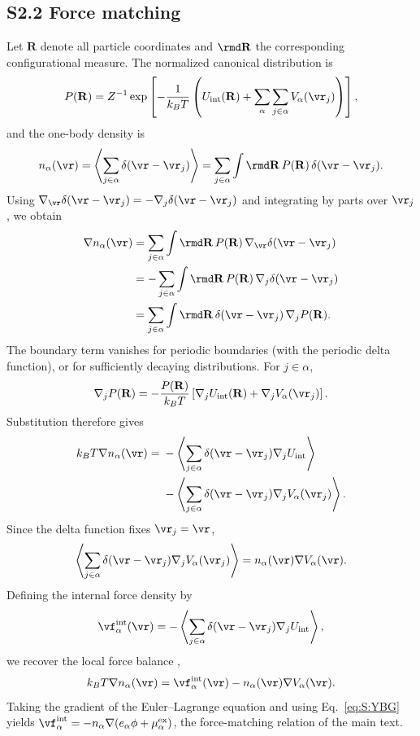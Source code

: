\subsection*{S2.2 Force matching}
Let $\mathbf R$ denote all particle coordinates and
$\rmd\mathbf R$ the corresponding configurational measure.
The normalized canonical distribution is
\[
P(\mathbf R)
=
Z^{-1}\exp\left[
-\frac{1}{k_BT}
\left(
U_{\rm int}(\mathbf R)
+\sum_\alpha\sum_{j\in\alpha}V_\alpha(\vr_j)
\right)
\right],
\]
and the one-body density is
\[
n_\alpha(\vr)
=
\left\langle
\sum_{j\in\alpha}\delta(\vr-\vr_j)
\right\rangle
=
\sum_{j\in\alpha}\int\rmd\mathbf R\,
P(\mathbf R)\,\delta(\vr-\vr_j).
\]
Using
$\nabla_{\vr}\delta(\vr-\vr_j)
=-\nabla_j\delta(\vr-\vr_j)$
and integrating by parts over $\vr_j$, we obtain
\[
\begin{aligned}
\nabla n_\alpha(\vr)
&=
\sum_{j\in\alpha}\int\rmd\mathbf R\,
P(\mathbf R)\,\nabla_{\vr}\delta(\vr-\vr_j)\\
&=
-\sum_{j\in\alpha}\int\rmd\mathbf R\,
P(\mathbf R)\,\nabla_j\delta(\vr-\vr_j)\\
&=
\sum_{j\in\alpha}\int\rmd\mathbf R\,
\delta(\vr-\vr_j)\,\nabla_jP(\mathbf R).
\end{aligned}
\]
The boundary term vanishes for periodic boundaries
(with the periodic delta function), or for sufficiently
decaying distributions. For $j\in\alpha$,
\[
\nabla_jP(\mathbf R)
=
-\frac{P(\mathbf R)}{k_BT}
\left[
\nabla_jU_{\rm int}(\mathbf R)
+\nabla_jV_\alpha(\vr_j)
\right].
\]
Substitution therefore gives
\[
\begin{aligned}
k_BT\nabla n_\alpha(\vr)
={}&
-\left\langle
\sum_{j\in\alpha}\delta(\vr-\vr_j)
\nabla_jU_{\rm int}
\right\rangle\\
&-
\left\langle
\sum_{j\in\alpha}\delta(\vr-\vr_j)
\nabla_jV_\alpha(\vr_j)
\right\rangle.
\end{aligned}
\]
Since the delta function fixes $\vr_j=\vr$,
\[
\left\langle
\sum_{j\in\alpha}\delta(\vr-\vr_j)
\nabla_jV_\alpha(\vr_j)
\right\rangle
=
n_\alpha(\vr)\nabla V_\alpha(\vr).
\]
Defining the internal force density by
\[
\vf^{\rm int}_\alpha(\vr)
=
-\left\langle
\sum_{j\in\alpha}\delta(\vr-\vr_j)
\nabla_jU_{\rm int}
\right\rangle,
\]
we recover the local force balance
\cite{tschopp2022force,hansen2013theory},
\begin{equation}
k_BT\nabla n_\alpha(\vr)
=
\vf^{\rm int}_\alpha(\vr)
-n_\alpha(\vr)\nabla V_\alpha(\vr).
\label{eq:S:YBG}
\end{equation}
Taking the gradient of the Euler--Lagrange equation and using Eq.~\ref{eq:S:YBG} yields $\vf^{\rm int}_\alpha=-n_\alpha\nabla(e_\alpha\phi+\mu^{\rm ex}_\alpha)$, the force-matching relation of the main text. 

